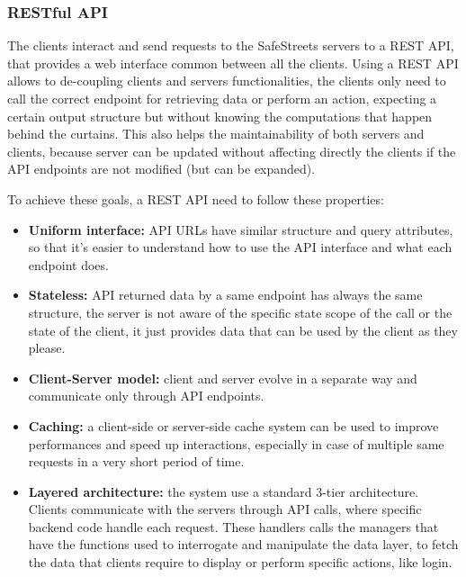 \subsubsection{RESTful API}

The clients interact and send requests to the SafeStreets servers to a REST API, that provides a web interface common between all the clients. Using a REST API allows to de-coupling clients and servers functionalities, the clients only need to call the correct endpoint for retrieving data or perform an action, expecting a certain output structure but without knowing the computations that happen behind the curtains. This also helps the maintainability of both servers and clients, because server can be updated without affecting directly the clients if the API endpoints are not modified (but can be expanded).

To achieve these goals, a REST API need to follow these properties:
\begin{itemize}
	\item \textbf{Uniform interface:} API URLs have similar structure and query attributes, so that it's easier to understand how to use the API interface and what each endpoint does.
	\item \textbf{Stateless:} API returned data by a same endpoint has always the same structure, the server is not aware of the specific state scope of the call or the state of the client, it just provides data that can be used by the client as they please.  
	\item \textbf{Client-Server model:} client and server evolve in a separate way and communicate only through API endpoints.
	\item \textbf{Caching:} a client-side or server-side cache system can be used to improve performances and speed up interactions, especially in case of multiple same requests in a very short period of time.
	\item \textbf{Layered architecture:} the system use a standard 3-tier architecture. Clients communicate with the servers through API calls, where specific backend code handle each request. These handlers calls the managers that have the functions used to interrogate and manipulate the data layer, to fetch the data that clients require to display or perform specific actions, like login.
\end{itemize}